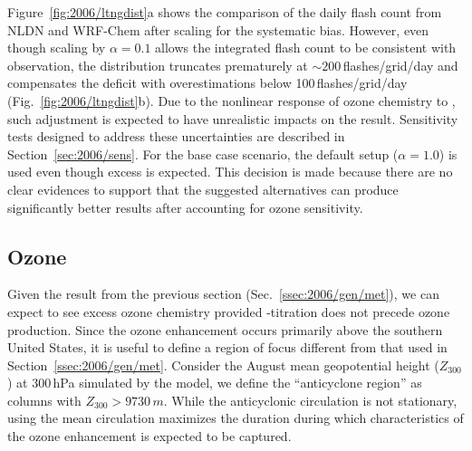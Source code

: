 Figure~\ref{fig:2006/ltngdist}a shows the comparison of the daily flash count from NLDN and WRF-Chem after scaling for the
systematic bias. However, even though scaling by $\alpha=0.1$ allows the integrated flash count to be consistent with observation,
the distribution truncates prematurely at $\sim200$\,\unit{flashes/grid/day} and compensates the deficit with overestimations
below 100\,\unit{flashes/grid/day} (Fig.~\ref{fig:2006/ltngdist}b). Due to the nonlinear response of ozone chemistry to {\lnox}, such adjustment is
expected to have unrealistic impacts on the result. Sensitivity tests designed to address these uncertainties are described in
Section~\ref{sec:2006/sens}. For the base case scenario, the default setup ($\alpha=1.0$) is used even though excess {\lnox}
is expected. This decision is made because there are no clear evidences to support that the suggested alternatives can
produce significantly better results after accounting for ozone sensitivity.

\subsection{Ozone}\label{ssec:2006/gen/ozone}

Given the result from the previous section (Sec.~\ref{ssec:2006/gen/met}), we can expect to see excess ozone chemistry provided
-titration does not precede ozone production. Since the ozone enhancement occurs primarily above the southern
United States, it is useful to define a region of focus different from that used in Section~\ref{ssec:2006/gen/met}. Consider the
August mean geopotential height ($Z_{300}$) at 300\,\unit{hPa} simulated by the model, we define the ``anticyclone region'' as
columns with $Z_{300}>9730\,\unit{m}$. While the anticyclonic circulation is not stationary, using the mean circulation maximizes
the duration during which characteristics of the ozone enhancement is expected to be captured.

